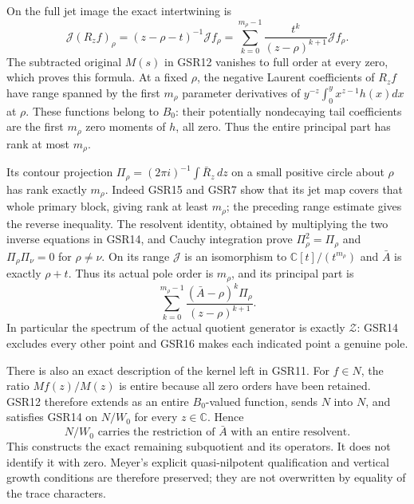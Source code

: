 On the full jet image the exact
intertwining is
\begin{equation}\tag{GSR15}
 \mathcal J(R_zf)_\rho
    =(z-\rho-t)^{-1}\mathcal Jf_\rho
    =\sum_{k=0}^{m_\rho-1}
       \frac{t^k}{(z-\rho)^{k+1}}\mathcal Jf_\rho .
\end{equation}
The subtracted original $M(s)$ in
GSR12 vanishes to full order at
every zero, which proves this formula.
At a fixed $\rho$, the negative
Laurent coefficients of $R_zf$
have range spanned by the first
$m_\rho$ parameter derivatives of
$y^{-z}\int_0^y x^{z-1}h(x)dx$
at $\rho$. These functions belong
to $B_0$: their potentially
nondecaying tail coefficients are
the first $m_\rho$ zero moments
of $h$, all zero. Thus the
entire principal part has rank
at most $m_\rho$.

Its contour projection
$\Pi_\rho=(2\pi i)^{-1}\int\bar R_z\,dz$
on a small positive circle about
$\rho$ has rank exactly $m_\rho$.
Indeed GSR15 and GSR7 show that
its jet map covers that whole
primary block, giving rank at
least $m_\rho$; the preceding
range estimate gives the reverse
inequality. The resolvent identity,
obtained by multiplying the two
inverse equations in GSR14, and
Cauchy integration prove
$\Pi_\rho^2=\Pi_\rho$ and
$\Pi_\rho\Pi_\nu=0$ for $\rho\ne\nu$.
On its range $\mathcal J$ is an
isomorphism to
$\mathbb C[t]/(t^{m_\rho})$ and
$\bar A$ is exactly $\rho+t$.
Thus its actual pole order is
$m_\rho$, and its principal part is
\begin{equation}\tag{GSR16}
 \sum_{k=0}^{m_\rho-1}
     \frac{(\bar A-\rho)^k\Pi_\rho}
                             {(z-\rho)^{k+1}}.
\end{equation}
In particular the spectrum of the
actual quotient generator is
exactly $\mathcal Z$: GSR14 excludes
every other point and GSR16 makes
each indicated point a genuine pole.

There is also an exact description
of the kernel left in GSR11.
For $f\in N$, the ratio $Mf(z)/M(z)$
is entire because all zero orders
have been retained. GSR12 therefore
extends as an entire $B_0$-valued
function, sends $N$ into $N$, and
satisfies GSR14 on $N/W_0$ for
every $z\in\mathbb C$. Hence
\begin{equation}\tag{GSR17}
 N/W_0\text{ carries the restriction of }\bar A
       \text{ with an entire resolvent.}
\end{equation}
This constructs the exact remaining
subquotient and its operators.
It does not identify it with zero.
Meyer's explicit quasi-nilpotent
qualification and vertical growth
conditions are therefore preserved;
they are not overwritten by equality
of the trace characters.

